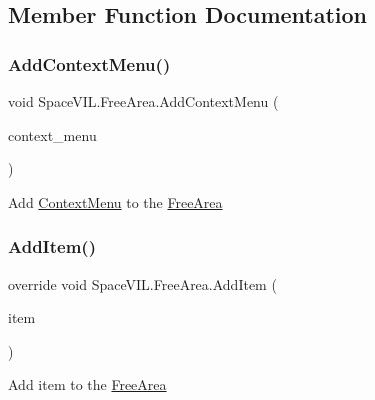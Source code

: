 \subsection{Member Function Documentation}
\mbox{\label{class_space_v_i_l_1_1_free_area_af8b1aa9fc2390fb36a34b6bf4d1ef76a}} 
\subsubsection{\texorpdfstring{Add\+Context\+Menu()}{AddContextMenu()}}
{\footnotesize\ttfamily void Space\+V\+I\+L.\+Free\+Area.\+Add\+Context\+Menu (\begin{DoxyParamCaption}\item[{\mbox{\hyperlink{class_space_v_i_l_1_1_context_menu}{Context\+Menu}}}]{context\+\_\+menu }\end{DoxyParamCaption})}



Add \mbox{\hyperlink{class_space_v_i_l_1_1_context_menu}{Context\+Menu}} to the \mbox{\hyperlink{class_space_v_i_l_1_1_free_area}{Free\+Area}} 

\mbox{\label{class_space_v_i_l_1_1_free_area_a9145cbd1711d975fee90fde3187c1aff}} 
\subsubsection{\texorpdfstring{Add\+Item()}{AddItem()}}
{\footnotesize\ttfamily override void Space\+V\+I\+L.\+Free\+Area.\+Add\+Item (\begin{DoxyParamCaption}\item[{\mbox{\hyperlink{interface_space_v_i_l_1_1_core_1_1_i_base_item}{I\+Base\+Item}}}]{item }\end{DoxyParamCaption})\hspace{0.3cm}{\ttfamily [virtual]}}



Add item to the \mbox{\hyperlink{class_space_v_i_l_1_1_free_area}{Free\+Area}} 




